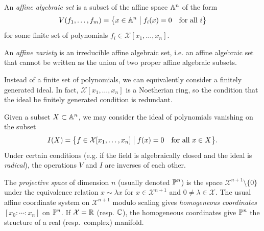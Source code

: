 \documentclass[cclicense]{hmcthesis}
\newcommand*{\F}{\mathcal{X}}
\newcommand*{\vbar}{\;\big\vert\;}
\numberwithin{equation}{section}
\begin{document}
    \begin{definition}
        An \emph{affine algebraic set} is a subset of the affine space $\mathbb{A}^n$
        of the form
        \[
            V(f_1, \ldots, f_m)
            = \cdel[\big]{x \in \A^n \vbar f_i(x) = 0 \quad\text{for all $i$}}
        \]
        for some finite set of polynomials $f_i \in \F[x_1, \ldots, x_n]$.

        An \emph{affine variety} is an irreducible affine algebraic set, i.e. an
        affine algebraic set that cannot be written as the union of two proper
        affine algebraic subsets.
    \end{definition}
    \noindent Instead of a finite set of polynomials, we can equivalently
    consider a finitely generated ideal.  In fact, $\F[x_1,\ldots,x_n]$ is a
    Noetherian ring, so the condition that the ideal be finitely generated
    condition is redundant.

    Given a subset $X \subset \mathbb{A}^n$, we may consider the ideal of polynomials
    vanishing on the subset
    \[
        I(X) = \cdel[\big]{f \in \F[x_1, \ldots, x_n] \vbar f(x) = 0 \quad\text{for
        all $x \in X$}}.
    \]
    Under certain conditions (e.g. if the field is algebraically closed and the
    ideal is \emph{radical}), the operations $V$ and $I$ are inverses of each other.

    \begin{definition}
        The \emph{projective space} of dimension $n$ (usually denoted $\mathbb{P}^n$)
        is the space $\F^{n+1}\setminus \{0\}$ under the equivalence relation $x
        \sim \lambda x$ for $x \in \F^{n+1}$ and $0 \ne \lambda \in \F$.  The
        usual affine coordinate system on $\F^{n+1}$ modulo scaling gives
        \emph{homogeneous coordinates} $[x_0: \cdots: x_n]$ on $\mathbb{P}^n$.  If
        $\F = \R$ (resp.  $\mathbb{C}$), the homogeneous coordinates give $\mathbb{P}^n$ the
        structure of a real (resp.\ complex) manifold.
    \end{definition}
\end{document}
